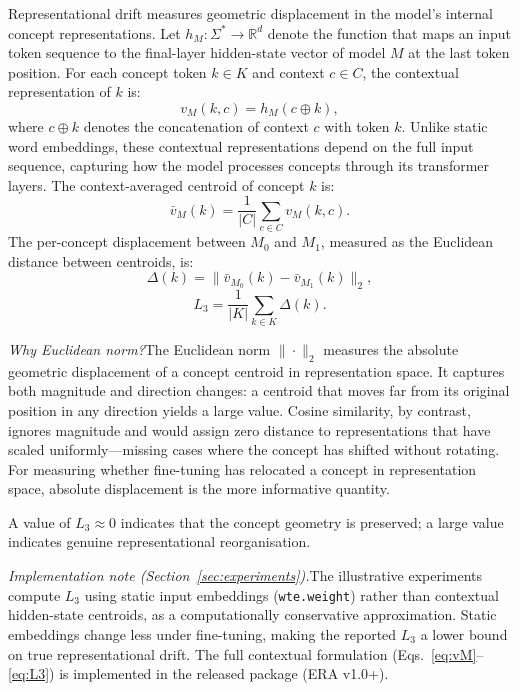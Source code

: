 \documentclass[11pt,a4paper]{article}
\newcommand{\M}[1]{M_{#1}}           %
\newcommand{\norm}[1]{\lVert #1 \rVert_2}
\begin{document}
Representational drift measures geometric displacement in the model's internal concept
representations. Let $h_M : \Sigma^* \to \mathbb{R}^d$ denote the function that maps
an input token sequence to the final-layer hidden-state vector of model $M$ at the last
token position. For each concept token $k \in K$ and context $c \in C$, the contextual
representation of $k$ is:
\begin{equation}
  v_M(k, c) = h_M(c \oplus k),
  \label{eq:vM}
\end{equation}
where $c \oplus k$ denotes the concatenation of context $c$ with token $k$. Unlike
static word embeddings, these contextual representations depend on the full input
sequence, capturing how the model processes concepts through its transformer layers.
The context-averaged centroid of concept $k$ is:
\begin{equation}
  \bar{v}_M(k) = \frac{1}{|C|} \sum_{c \in C} v_M(k, c).
  \label{eq:centroid}
\end{equation}
The per-concept displacement between $\M{0}$ and $\M{1}$, measured as the Euclidean
distance between centroids, is:
\begin{equation}
  \Delta(k) = \norm{\bar{v}_{\M{0}}(k) - \bar{v}_{\M{1}}(k)},
  \label{eq:delta}
\end{equation}
\begin{equation}
  L_3 = \frac{1}{|K|} \sum_{k \in K} \Delta(k).
  \label{eq:L3}
\end{equation}

\noindent\textit{Why Euclidean norm?}\enspace The Euclidean norm $\|\cdot\|_2$ measures
the absolute geometric displacement of a concept centroid in representation space. It
captures both magnitude and direction changes: a centroid that moves far from its original
position in any direction yields a large value. Cosine similarity, by contrast, ignores
magnitude and would assign zero distance to representations that have scaled
uniformly---missing cases where the concept has shifted without rotating. For measuring
whether fine-tuning has relocated a concept in representation space, absolute displacement
is the more informative quantity.

A value of $L_3 \approx 0$ indicates that the concept geometry is preserved; a large
value indicates genuine representational reorganisation.

\medskip
\noindent\textit{Implementation note (Section~\ref{sec:experiments}).}\enspace The
illustrative experiments compute $L_3$ using static input embeddings (\texttt{wte.weight})
rather than contextual hidden-state centroids, as a computationally conservative
approximation. Static embeddings change less under fine-tuning, making the reported $L_3$
a lower bound on true representational drift. The full contextual formulation
(Eqs.~\eqref{eq:vM}--\eqref{eq:L3}) is implemented in the released package (ERA v1.0+).
\end{document}

